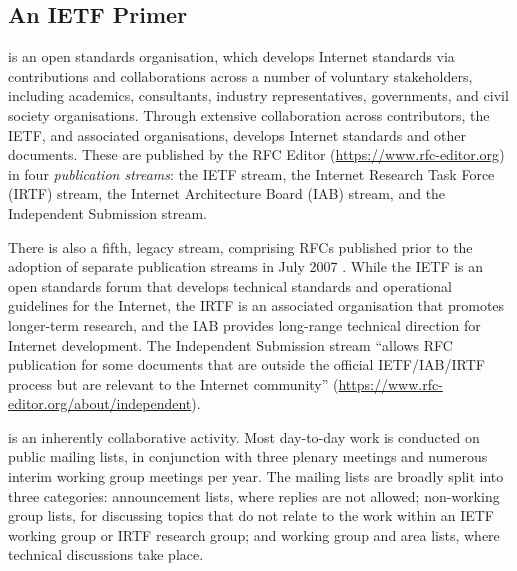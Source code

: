 \documentclass[twocolumn,10pt]{article}
\newcommand{\pb}[1]{\vspace{0.75ex}\noindent{\textbf{#1}}}
\begin{document}
\subsection{An IETF Primer}


\pb{The IETF} is an open standards organisation, which develops
Internet standards via contributions and collaborations across a number of
voluntary stakeholders, including academics, consultants, industry
representatives, governments, and civil society organisations.  Through
extensive collaboration across contributors, the IETF, and associated
organisations, develops Internet standards and other documents. These are
published by the RFC Editor (\url{https://www.rfc-editor.org}) in four
\emph{publication streams}: the IETF stream, the Internet Research Task
Force (IRTF) stream, the Internet Architecture Board (IAB) stream, and the
Independent Submission stream.

There is also a fifth, legacy stream, comprising RFCs published prior to
the adoption of separate publication streams in July 2007 \cite{RFC4844}.
While the IETF is an open standards forum that develops technical standards
and operational guidelines for the Internet, the IRTF is an associated
organisation that promotes longer-term research, and the IAB provides
long-range technical direction for Internet development. The Independent
Submission stream ``allows RFC publication for some documents that are
outside the official IETF/IAB/IRTF process but are relevant to the Internet
community'' (\url{https://www.rfc-editor.org/about/independent}).

\pb{The standards development process} is an inherently collaborative
activity.  Most day-to-day work is conducted on public mailing lists, in
conjunction with three plenary meetings and numerous interim working group
meetings per year. 
The mailing lists are broadly split into three categories: announcement
lists, where replies are not allowed; non-working group lists, for
discussing topics that do not relate to the work within an IETF working
group or IRTF research group; and working group and area lists, where
technical discussions take place.
\end{document}
